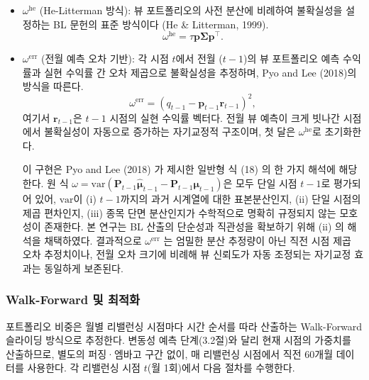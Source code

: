\documentclass{article}
\begin{document}
\begin{itemize}
  \item $\omega^{\mathrm{he}}$ (He-Litterman 방식): 뷰 포트폴리오의 사전 분산에 비례하여 불확실성을 설정하는 BL 문헌의 표준 방식이다 (He & Litterman, 1999).
    \begin{equation}
      \omega^{\mathrm{he}} = \tau\mathbf{p}\boldsymbol{\Sigma}\mathbf{p}^\top.
    \end{equation}

  \item $\omega^{\mathrm{err}}$ (전월 예측 오차 기반): 각 시점 $t$에서 전월 ($t-1$)의 뷰 포트폴리오 예측 수익률과 실현 수익률 간 오차 제곱으로 불확실성을 추정하며, Pyo and Lee (2018)의 방식을 따른다.
    \begin{equation}
      \omega^{\mathrm{err}} = \left(q_{t-1} - \mathbf{p}_{t-1}\mathbf{r}_{t-1}\right)^2,
    \end{equation}
    여기서 $\mathbf{r}_{t-1}$은 $t-1$ 시점의 실현 수익률 벡터다. 전월 뷰 예측이 크게 빗나간 시점에서 불확실성이 자동으로 증가하는 자기교정적 구조이며, 첫 달은 $\omega^{\mathrm{he}}$로 초기화한다.

    이 구현은 Pyo and Lee (2018) 가 제시한 일반형 식 (18) 의 한 가지 해석에 해당한다. 원 식 $\omega = \mathrm{var}(\mathbf{P}_{t-1}\hat{\boldsymbol{\mu}}_{t-1} - \mathbf{P}_{t-1}\boldsymbol{\mu}_{t-1})$은 모두 단일 시점 $t-1$로 평가되어 있어, $\mathrm{var}$이 (i) $t-1$까지의 과거 시계열에 대한 표본분산인지, (ii) 단일 시점의 제곱 편차인지, (iii) 종목 단면 분산인지가 수학적으로 명확히 규정되지 않는 모호성이 존재한다. 본 연구는 BL 산출의 단순성과 직관성을 확보하기 위해 (ii) 의 해석을 채택하였다. 결과적으로 $\omega^{\mathrm{err}}$ 는 엄밀한 분산 추정량이 아닌 직전 시점 제곱 오차 추정치이나, 전월 오차 크기에 비례해 뷰 신뢰도가 자동 조정되는 자기교정 효과는 동일하게 보존된다.
\end{itemize}

\subsubsection{Walk-Forward 및 최적화}
\label{subsubsec:bl_walkforward}

포트폴리오 비중은 월별 리밸런싱 시점마다 시간 순서를 따라 산출하는 Walk-Forward 슬라이딩 방식으로 추정한다. 변동성 예측 단계(3.2절)와 달리 현재 시점의 가중치를 산출하므로, 별도의 퍼징·엠바고 구간 없이, 매 리밸런싱 시점에서 직전 60개월 데이터를 사용한다. 각 리밸런싱 시점 $t$(월 1회)에서 다음 절차를 수행한다.
\end{document}
